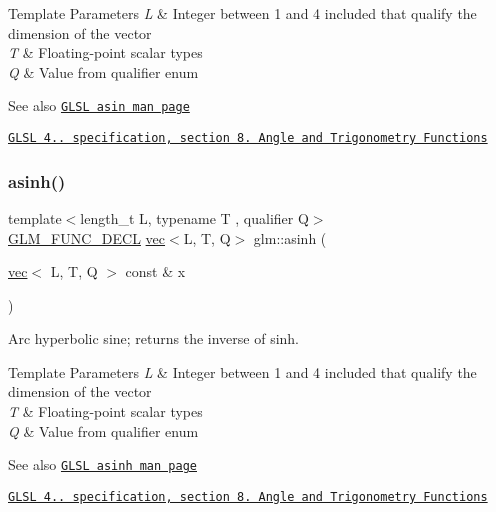 \begin{DoxyTemplParams}{Template Parameters}
{\em L} & Integer between 1 and 4 included that qualify the dimension of the vector \\
\hline
{\em T} & Floating-\/point scalar types \\
\hline
{\em Q} & Value from qualifier enum\\
\hline
\end{DoxyTemplParams}
\begin{DoxySeeAlso}{See also}
\href{http://www.opengl.org/sdk/docs/manglsl/xhtml/asin.xml}{\tt G\+L\+SL asin man page} 

\href{http://www.opengl.org/registry/doc/GLSLangSpec.4.20.8.pdf}{\tt G\+L\+SL 4.. specification, section 8. Angle and Trigonometry Functions} 
\end{DoxySeeAlso}
\mbox{\label{group__core__func__trigonometric_ga3ef16b501ee859fddde88e22192a5950}} 
\subsubsection{\texorpdfstring{asinh()}{asinh()}}
{\footnotesize\ttfamily template$<$length\+\_\+t L, typename T , qualifier Q$>$ \\
\mbox{\hyperlink{setup_8hpp_ab2d052de21a70539923e9bcbf6e83a51}{G\+L\+M\+\_\+\+F\+U\+N\+C\+\_\+\+D\+E\+CL}} \mbox{\hyperlink{structglm_1_1vec}{vec}}$<$L, T, Q$>$ glm\+::asinh (\begin{DoxyParamCaption}\item[{\mbox{\hyperlink{structglm_1_1vec}{vec}}$<$ L, T, Q $>$ const \&}]{x }\end{DoxyParamCaption})}

Arc hyperbolic sine; returns the inverse of sinh.


\begin{DoxyTemplParams}{Template Parameters}
{\em L} & Integer between 1 and 4 included that qualify the dimension of the vector \\
\hline
{\em T} & Floating-\/point scalar types \\
\hline
{\em Q} & Value from qualifier enum\\
\hline
\end{DoxyTemplParams}
\begin{DoxySeeAlso}{See also}
\href{http://www.opengl.org/sdk/docs/manglsl/xhtml/asinh.xml}{\tt G\+L\+SL asinh man page} 

\href{http://www.opengl.org/registry/doc/GLSLangSpec.4.20.8.pdf}{\tt G\+L\+SL 4.. specification, section 8. Angle and Trigonometry Functions} 
\end{DoxySeeAlso}
\mbox{\label{group__core__func__trigonometric_gac61629f3a4aa14057e7a8cae002291db}} 
